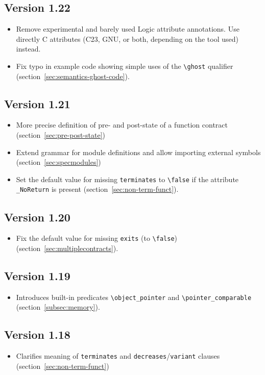 \subsection{Version 1.22}
\begin{itemize}
\item Remove experimental and barely used Logic attribute annotations.
Use directly C attributes (C23, GNU, or both, depending on the tool used) instead.
\item Fix typo in example code showing simple uses of the \lstinline|\ghost| qualifier (section~\ref{sec:semantics-ghost-code}).
\end{itemize}
\subsection{Version 1.21}
\begin{itemize}
\item More precise definition of pre- and post-state of a function contract
  (section~\ref{sec:pre-post-state})
\item Extend grammar for module definitions and allow importing external symbols
  (section~\ref{sec:specmodules})
\item Set the default value for missing \lstinline|terminates| to
  \lstinline|\false| if the attribute \lstinline|_NoReturn| is present
  (section~\ref{sec:non-term-funct}).
\end{itemize}
\subsection{Version 1.20}
\begin{itemize}
\item Fix the default value for missing \lstinline|exits| (to
\lstinline|\false|) (section~\ref{sec:multiplecontracts}).
\end{itemize}
\subsection{Version 1.19}
\begin{itemize}
\item Introduces built-in predicates \lstinline|\object_pointer| and
\lstinline|\pointer_comparable| (section~\ref{subsec:memory}).
\end{itemize}
\subsection{Version 1.18}
\begin{itemize}
\item Clarifies meaning of \lstinline|terminates| and
  \lstinline|decreases|/\lstinline|variant| clauses (section~\ref{sec:non-term-funct})
\end{itemize}
